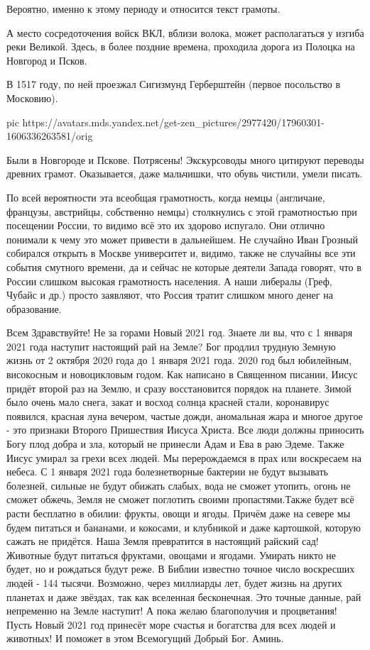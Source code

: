 \begin{itemize}
Вероятно, именно к этому периоду и относится текст грамоты.

А место сосредоточения войск ВКЛ, вблизи волока, может располагаться у изгиба
реки Великой. Здесь, в более поздние времена, проходила дорога из Полоцка на
Новгород и Псков.

В 1517 году, по ней проезжал Сигизмунд Герберштейн (первое посольство в
Московию).

\ifcmt
pic https://avatars.mds.yandex.net/get-zen_pictures/2977420/17960301-1606336263581/orig
\fi


Были в Новгороде и Пскове. Потрясены! Экскурсоводы много цитируют переводы
древних грамот. Оказывается, даже мальчишки, что обувь чистили, умели писать.


По всей вероятности эта всеобщая грамотность, когда немцы (англичане, французы, австрийцы, собственно немцы) столкнулись с этой грамотностью при посещении России, то видимо всё это их здорово испугало. Они отлично понимали к чему это может привести в дальнейшем. Не случайно Иван Грозный собирался открыть в Москве университет и, видимо, также не случайны все эти события смутного времени, да и сейчас не которые деятели Запада говорят, что в России слишком высокая грамотность населения. А наши либералы (Греф, Чубайс и др.) просто заявляют, что Россия тратит слишком много денег на образование.


Всем Здравствуйте! Не за горами Новый 2021 год. Знаете ли вы, что с 1 января
2021 года наступит настоящий рай на Земле? Бог продлил трудную Земную жизнь от
2 октября 2020 года до 1 января 2021 года. 2020 год был юбилейным, високосным и
новоцикловым годом. Как написано в Священном писании, Иисус придёт второй раз
на Землю, и сразу восстановится порядок на планете. Зимой было очень мало
снега, закат и восход солнца красней стали, коронавирус появился, красная луна
вечером, частые дожди, аномальная жара и многое другое - это признаки Второго
Пришествия Иисуса Христа. Все люди должны приносить Богу плод добра и зла,
который не принесли Адам и Ева в раю Эдеме. Также Иисус умирал за грехи всех
людей. Мы перерождаемся в прах или воскресаем на небеса. С 1 января 2021 года
болезнетворные бактерии не будут вызывать болезней, сильные не будут обижать
слабых, вода не сможет утопить, огонь не сможет обжечь, Земля не сможет
поглотить своими пропастями.Также будет всё расти бесплатно в обилии: фрукты,
овощи и ягоды. Причём даже на севере мы будем питаться и бананами, и кокосами,
и клубникой и даже картошкой, которую сажать не придётся. Наша Земля
превратится в настоящий райский сад! Животные будут питаться фруктами, овощами
и ягодами. Умирать никто не будет, но и рождаться будут реже. В Библии известно
точное число воскресших людей - 144 тысячи. Возможно, через миллиарды лет,
будет жизнь на других планетах и даже звёздах, так как вселенная бесконечная.
Это точные данные, рай непременно на Земле наступит! А пока желаю благополучия
и процветания! Пусть Новый 2021 год принесёт море счастья и богатства для всех
людей и животных! И поможет в этом Всемогущий Добрый Бог. Аминь.


\end{itemize}
